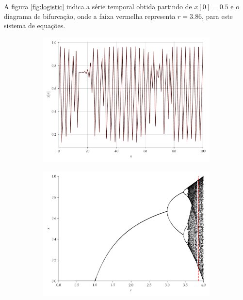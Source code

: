 \documentclass[a4paper, 12pt]{article}
\begin{document}
A figura \ref{fig:logistic} indica a série temporal obtida partindo de $x[0] = 0.5$ e o diagrama de bifurcação, onde a faixa vermelha representa $r = 3.86$, para este sistema de equações.
\begin{figure}[H]
     \begin{subfigure}[t]{0.32\textwidth} 
         \includegraphics[scale=0.32]{serie-logistico.pdf}
     \end{subfigure}
     \centering
     \begin{subfigure}[t]{0.32\textwidth} 
         \includegraphics[scale=0.32]{mapa-logistico.png}
     \end{subfigure}
     \centering

\end{figure}
\end{document}
